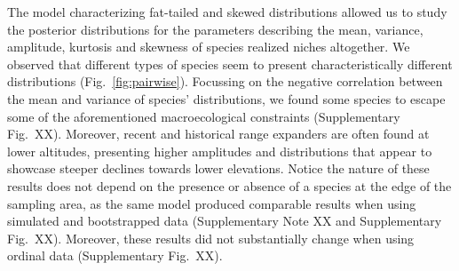 \documentclass[11pt, a4paper]{article}
\begin{document}
The model characterizing fat-tailed and skewed distributions allowed us to study the posterior distributions for the parameters describing the mean, variance, amplitude, kurtosis and skewness of species realized niches altogether. We observed that different types of species seem to present characteristically different distributions (Fig.~\ref{fig:pairwise}). Focussing on the negative correlation between the mean and variance of species' distributions, we found some species to escape some of the aforementioned macroecological constraints (Supplementary Fig.~XX).  Moreover, recent and historical range expanders are often found at lower altitudes, presenting higher amplitudes and distributions that appear to showcase steeper declines towards lower elevations. Notice the nature of these results does not depend on the presence or absence of a species at the edge of the sampling area, as the same model produced comparable results when using simulated and bootstrapped data (Supplementary Note XX and Supplementary Fig.~XX). Moreover, these results did not substantially change when using ordinal data (Supplementary Fig.~XX).


\end{document}
